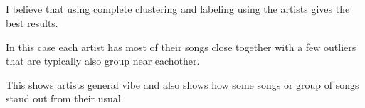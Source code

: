\documentclass[11pt]{article}
\begin{document}
    \begin{center}
    \end{center}
    { \hspace*{\fill} \\}
    
    \begin{center}
    \end{center}
    { \hspace*{\fill} \\}
    
    \begin{center}
    \end{center}
    { \hspace*{\fill} \\}
    
    \begin{center}
    \end{center}
    { \hspace*{\fill} \\}
    
    I believe that using complete clustering and labeling using the artists
gives the best results.

In this case each artist has most of their songs close together with a
few outliers that are typically also group near eachother.

This shows artists general vibe and also shows how some songs or group
of songs stand out from their usual.


    
    
    
\end{document}
